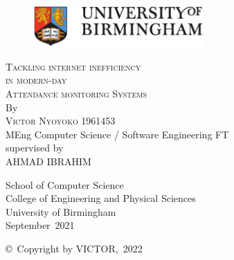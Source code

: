 \thispagestyle{empty}
\providecommand\pdfbookmark[3][]{} \pdfbookmark[0]{Title Page}{bm:Title}
\vspace*{1cm}
\begin{figure}[ht!]
\includegraphics[width=6.5cm]{frontmatter/images/full-colour-logo.eps}
\end{figure}
\vfill
\begin{flushleft}
\textsc{\huge{Tackling internet inefficiency }}\\[0.5em]
\textsc{\huge{in modern-day}}\\[0.5em]
\textsc{\huge{Attendance monitoring Systems}}\\[0.5em]
\vfill
By\\[\baselineskip]
\textsc{\Large{Victor Nyoyoko}}
\vfill
1961453\\[-0.8em]
MEng Computer Science / Software Engineering FT\\[-0.8em]
\vfill
supervised by\\[-0.8em]
\vfill
\MakeUppercase{AHMAD IBRAHIM} \\[\baselineskip]
\end{flushleft}
\begin{flushright}
School of Computer Science\\[-0.8em]
College of Engineering and Physical Sciences\\[-0.8em]
University of Birmingham\\[-0.8em]
September~2021 \\[\baselineskip]
\end{flushright}
\copyright\ Copyright by \MakeUppercase{\@Nyoyoko Victor},~\@2022\
\clearpage
